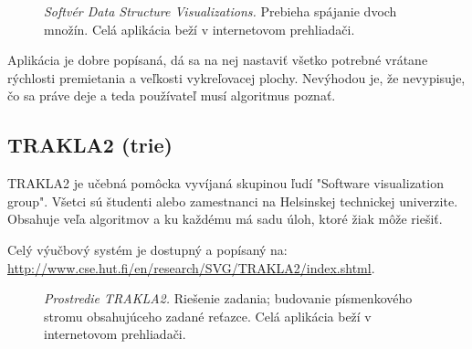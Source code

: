 \begin{figure}
\centering
{}
\caption{\emph{Softvér Data Structure Visualizations.} Prebieha spájanie dvoch 
množín. Celá aplikácia beží v internetovom prehliadači.}
\label{img:vis:galles}
\end{figure}

Aplikácia je dobre popísaná, dá sa na nej nastaviť všetko potrebné vrátane 
rýchlosti premietania a veľkosti vykreľovacej plochy. Nevýhodou je, že 
nevypisuje, čo sa práve deje a teda používateľ musí algoritmus poznať.

\subsection{TRAKLA2 (trie)}\label{sec:trakla}

TRAKLA2 je učebná pomôcka vyvíjaná skupinou ľudí "Software visualization 
group". Všetci sú študenti alebo zamestnanci na Helsinskej technickej 
univerzite. Obsahuje veľa algoritmov a ku každému má sadu úloh, ktoré žiak 
môže riešiť. 

Celý výučbový systém je dostupný a popísaný na: 
\url{http://www.cse.hut.fi/en/research/SVG/TRAKLA2/index.shtml}.

\begin{figure}
\centering
{}
\caption{\emph{Prostredie TRAKLA2.} Riešenie zadania; budovanie písmenkového 
stromu obsahujúceho zadané reťazce. Celá aplikácia beží v internetovom 
prehliadači.}
\label{img:vis:trakla2}
\end{figure}

